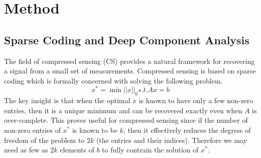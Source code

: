 \section{Method}
\subsection{Sparse Coding and Deep Component Analysis}
\label{sec:compr-sens-deep}

The field of compressed sensing (CS) provides a natural framework for recovering a signal from a small set of measurements. Compressed sensing is based on sparse coding which is formally concerned with solving the following problem. 
\begin{equation}
  \label{eq:1}
  x^* = \min \left||x\right||_0 s.t. Ax = b
\end{equation}
The key insight is that when the optimal $x$ is known to have only a few non-zero entries, then it is a unique minimum and can be recovered exactly even when $A$ is over-complete. This proves useful for compressed sensing since if the number of non-zero entries of $x^*$ is known to be $k$, then it effectively reduces the degress of freedom of the problem to $2k$ (the entries and their indices). Therefore we may need as few as $2k$ elements of $b$ to fully contrain the solution of $x^{*}$.\\

